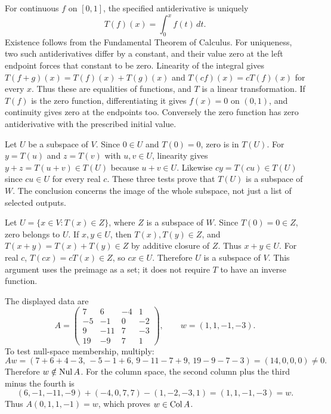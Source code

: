 For continuous $f$ on $[0,1]$, the specified antiderivative is uniquely
\[
 T(f)(x)=\int_0^x f(t)\,dt.
\]
Existence follows from the Fundamental Theorem of Calculus. For uniqueness,
two such antiderivatives differ by a constant, and their value zero at the
left endpoint forces that constant to be zero.
Linearity of the integral gives
$T(f+g)(x)=T(f)(x)+T(g)(x)$ and $T(cf)(x)=cT(f)(x)$ for every $x$.
Thus these are equalities of functions, and $T$ is a linear transformation.
If $T(f)$ is the zero function, differentiating it gives $f(x)=0$ on $(0,1)$,
and continuity gives zero at the endpoints too. Conversely the zero function
has zero antiderivative with the prescribed initial value.

Let $U$ be a subspace of $V$. Since $0\in U$ and $T(0)=0$, zero is in
$T(U)$. For $y=T(u)$ and $z=T(v)$ with $u,v\in U$, linearity gives
$y+z=T(u+v)\in T(U)$ because $u+v\in U$.
Likewise $cy=T(cu)\in T(U)$ since $cu\in U$ for every real $c$.
These three tests prove that $T(U)$ is a subspace of $W$.
The conclusion concerns the image of the whole subspace, not just a list of selected outputs.

Let $U=\{x\in V:T(x)\in Z\}$, where $Z$ is a subspace of $W$.
Since $T(0)=0\in Z$, zero belongs to $U$.
If $x,y\in U$, then $T(x),T(y)\in Z$, and
$T(x+y)=T(x)+T(y)\in Z$ by additive closure of $Z$. Thus $x+y\in U$.
For real $c$, $T(cx)=cT(x)\in Z$, so $cx\in U$.
Therefore $U$ is a subspace of $V$. This argument uses the preimage as a set;
it does not require $T$ to have an inverse function.

The displayed data are
\[
 A=\begin{pmatrix}7&6&-4&1\\-5&-1&0&-2\\9&-11&7&-3\\19&-9&7&1\end{pmatrix},
 \qquad w=(1,1,-1,-3).
\]
To test null-space membership, multiply:
\[
 Aw=(7+6+4-3,\,-5-1+6,\,9-11-7+9,\,19-9-7-3)
 =(14,0,0,0)\ne0.
\]
Therefore $w\notin\operatorname{Nul} A$.
For the column space, the second column plus the third minus the fourth is
\[
 (6,-1,-11,-9)+(-4,0,7,7)-(1,-2,-3,1)=(1,1,-1,-3)=w.
\]
Thus $A(0,1,1,-1)=w$, which proves $w\in\operatorname{Col} A$.

